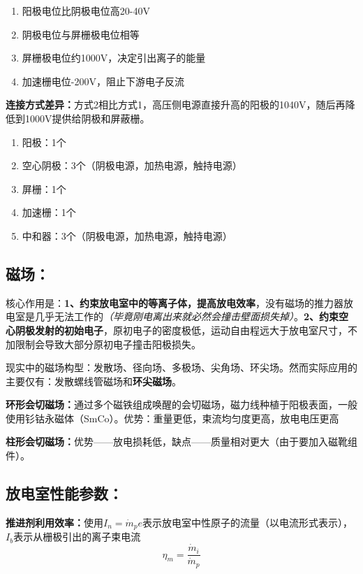     \begin{enumerate}
      \item 阳极电位比阴极电位高20-40V
      \item 阴极电位与屏栅极电位相等
      \item 屏栅极电位约1000V，决定引出离子的能量
      \item 加速栅电位-200V，阻止下游电子反流
    \end{enumerate}

    \textbf{连接方式差异：}方式2相比方式1，高压侧电源直接升高的阳极的1040V，随后再降低到1000V提供给阴极和屏蔽栅。

    \begin{enumerate}
      \item 阳极：1个
      \item 空心阴极：3个（阴极电源，加热电源，触持电源）
      \item 屏栅：1个
      \item 加速栅：1个
      \item 中和器：3个（阴极电源，加热电源，触持电源）
    \end{enumerate}

  \subsection{磁场：}
    核心作用是：\textbf{1、约束放电室中的等离子体，提高放电效率}，没有磁场的推力器放电室是几乎无法工作的\textit{（毕竟刚电离出来就必然会撞击壁面损失掉）}。\textbf{2、约束空心阴极发射的初始电子}，原初电子的密度极低，运动自由程远大于放电室尺寸，不加限制会导致大部分原初电子撞击阳极损失。

    现实中的磁场构型：发散场、径向场、多极场、尖角场、环尖场。然而实际应用的主要仅有：发散螺线管磁场和\textbf{环尖磁场}。

    \textbf{环形会切磁场：}通过多个磁铁组成唤醒的会切磁场，磁力线种植于阳极表面，一般使用钐钴永磁体（SmCo）。优势：重量更低，束流均匀度更高，放电电压更高

    \textbf{柱形会切磁场：}优势——放电损耗低，缺点——质量相对更大（由于要加入磁靴组件）。

  \subsection{放电室性能参数：}
    \textbf{推进剂利用效率：}使用$I_n = \dot{m}_p e$表示放电室中性原子的流量（以电流形式表示），$I_b$表示从栅极引出的离子束电流
    \begin{equation}
      \eta_m = \frac{\dot{m}_i}{\dot{m}_p}
    \end{equation}

